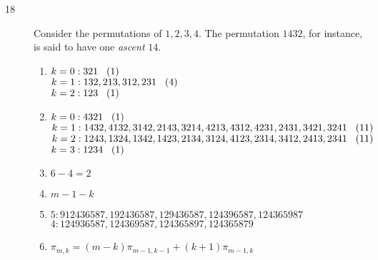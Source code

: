 \documentclass[a4paper]{article}
\begin{document}
\begin{description}
\item[18] Consider the permutations of $1,2,3,4$. The permutation $1432$, for instance, is said to have one \textit{ascent} $14$.
\begin{enumerate}[label=\alph*)]
  \item
    $k=0: 321 \hspace{3mm} (1)$\\
    $k=1: 132, 213, 312, 231 \hspace{3mm} (4)$\\
    $k=2: 123 \hspace{3mm} (1)$
  \item
    $k=0: 4321 \hspace{3mm} (1)$\\
    $k=1: 1432, 4132, 3142, 2143, 3214, 4213, 4312, 4231, 2431, 3421, 3241 \hspace{3mm} (11)$\\
    $k=2: 1243, 1324, 1342, 1423, 2134, 3124, 4123, 2314, 3412, 2413, 2341 \hspace{3mm} (11)$\\
    $k=3: 1234 \hspace{3mm} (1)$
  \item
  $6-4=2$
  \item
  $m-1-k$
  \item
  $5: 912436587,192436587,129436587,124396587,124365987$\\
  $4: 124936587,124369587,124365897,124365879$\\
  \item
  $\pi_{m,k}=(m-k)\pi_{m-1,k-1}+(k+1)\pi_{m-1,k}$
\end{enumerate}
\end{description}
\end{document}
